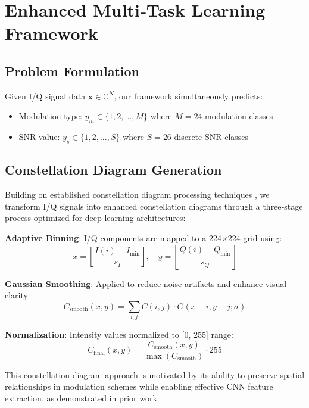 \documentclass{ELSP}
\begin{document}
\section{Enhanced Multi‑Task Learning Framework}

\subsection{Problem Formulation}

Given I/Q signal data $\mathbf{x} \in \mathbb{C}^N$, our framework simultaneously predicts:
\begin{itemize}
\item Modulation type: $y_m \in \{1, 2, ..., M\}$ where $M=24$ modulation classes
\item SNR value: $y_s \in \{1, 2, ..., S\}$ where $S=26$ discrete SNR classes
\end{itemize}

\subsection{Constellation Diagram Generation}

Building on established constellation diagram processing techniques \cite{doan2020learning,kumar2020automatic}, we transform I/Q signals into enhanced constellation diagrams through a three‑stage process optimized for deep learning architectures:

\textbf{Adaptive Binning}: I/Q components are mapped to a 224×224 grid using:
\begin{equation}
x = \left\lfloor \frac{I(i) - I_{\min}}{s_I} \right\rfloor, \quad y = \left\lfloor \frac{Q(i) - Q_{\min}}{s_Q} \right\rfloor
\end{equation}

\textbf{Gaussian Smoothing}: Applied to reduce noise artifacts and enhance visual clarity \cite{sun2022amc}:
\begin{equation}
C_{\text{smooth}}(x,y) = \sum_{i,j} C(i,j) \cdot G(x-i, y-j; \sigma)
\end{equation}

\textbf{Normalization}: Intensity values normalized to [0, 255] range:
\begin{equation}
C_{\text{final}}(x,y) = \frac{C_{\text{smooth}}(x,y)}{\max(C_{\text{smooth}})} \cdot 255
\end{equation}

This constellation diagram approach is motivated by its ability to preserve spatial relationships in modulation schemes while enabling effective CNN feature extraction, as demonstrated in prior work \cite{peng2021survey,sun2023novel}.
\end{document}
